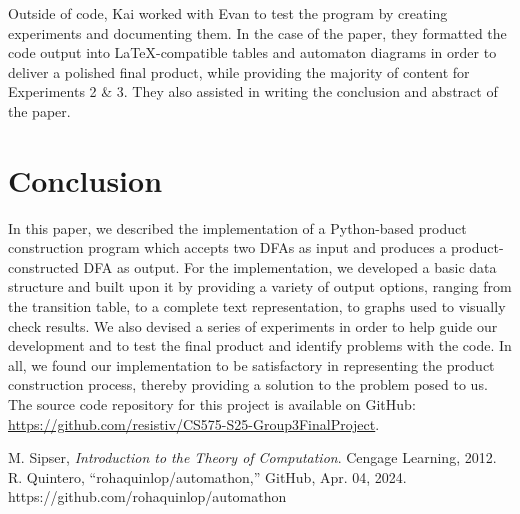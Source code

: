 \documentclass[conference]{IEEEtran}
\begin{document}
Outside of code, Kai worked with Evan to test the program by creating experiments and documenting them. In the case of the paper, they formatted the code output into \LaTeX-compatible tables and automaton diagrams in order to deliver a polished final product, while providing the majority of content for Experiments 2 \& 3. They also assisted in writing the conclusion and abstract of the paper.

\section{Conclusion}
In this paper, we described the implementation of a Python-based product construction program which accepts two DFAs as input and produces a product-constructed DFA as output. For the implementation, we developed a basic data structure and built upon it by providing a variety of output options, ranging from the transition table, to a complete text representation, to graphs used to visually check results. We also devised a series of experiments in order to help guide our development and to test the final product and identify problems with the code. In all, we found our implementation to be satisfactory in representing the product construction process, thereby providing a solution to the problem posed to us. The source code repository for this project is available on GitHub: \url{https://github.com/resistiv/CS575-S25-Group3FinalProject}.

\begin{thebibliography}{00}
 M. Sipser, \textit{Introduction to the Theory of Computation}. Cengage Learning, 2012.
 R. Quintero, “rohaquinlop/automathon,” GitHub, Apr. 04, 2024. https://github.com/rohaquinlop/automathon
\end{thebibliography}
\end{document}
